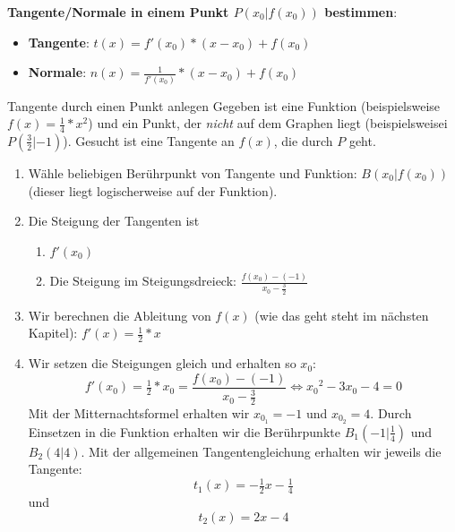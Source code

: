 \begin{koch}
  \textbf{Tangente/Normale in einem Punkt $P(x_0|f(x_0))$ bestimmen}: \\
  \begin{itemize}
    \item \textbf{Tangente}: $t(x)=f'(x_0)*(x-x_0)+f(x_0)$
    \item \textbf{Normale}: $n(x)=\frac{1}{f'(x_0)}*(x-x_0)+f(x_0)$
  \end{itemize}
\end{koch}



\begin{bla}{Tangente durch einen Punkt anlegen}
  Gegeben ist eine Funktion (beispielsweise $f(x)=\tfrac{1}{4}*x^2$) und ein Punkt, der \emph{nicht} auf dem Graphen liegt (beispielsweisei $P(\tfrac{3}{2}|-1)$). Gesucht ist eine Tangente an $f(x)$, die durch $P$ geht.
  \begin{enumerate}
    \item Wähle beliebigen Berührpunkt von Tangente und Funktion: $B(x_0|f(x_0))$ (dieser liegt logischerweise auf der Funktion).
    \item Die Steigung der Tangenten ist
    \begin{enumerate}
      \item $f'(x_0)$
      \item Die Steigung im Steigungsdreieck: $\frac{f(x_0)-(-1)}{x_0-\tfrac{3}{2}}$
    \end{enumerate}
    \item Wir berechnen die Ableitung von $f(x)$ (wie das geht steht im nächsten Kapitel): $f'(x)=\tfrac{1}{2}*x$
    \item Wir setzen die Steigungen gleich und erhalten so $x_0$:
    \begin{equation*}
      f'(x_0)=\tfrac{1}{2}*x_0=\frac{f(x_0)-(-1)}{x_0-\tfrac{3}{2}} \Leftrightarrow {x_0}^2-3x_0-4=0
    \end{equation*}
    Mit der Mitternachtsformel erhalten wir $x_{0_1}=-1$ und $x_{0_2}=4$. Durch Einsetzen in die Funktion erhalten wir die Berührpunkte $B_1(-1|\tfrac{1}{4})$ und $B_2(4|4)$. Mit der allgemeinen Tangentengleichung erhalten wir jeweils die Tangente:
    \begin{equation*}
      t_1(x)=-\tfrac{1}{2}x- \tfrac{1}{4}
    \end{equation*}
    und
    \begin{equation*}
      t_2(x)=2x-4
    \end{equation*}
  \end{enumerate}
\end{bla}

